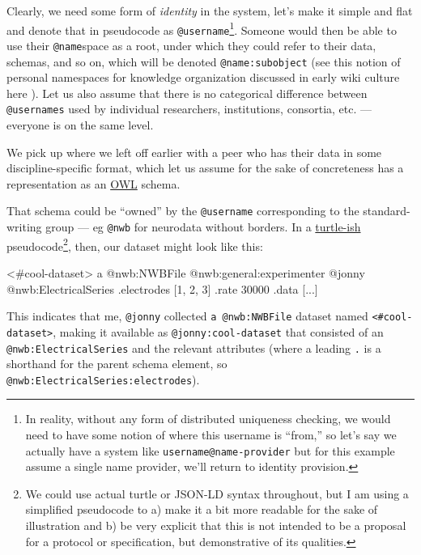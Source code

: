 \documentclass[10pt]{article}
\newenvironment{Shaded}{}{}
\newcommand{\NormalTok}[1]{#1}
\begin{document}
\begin{multicols}{2}
Clearly, we need some form of \emph{identity} in the system, let's make
it simple and flat and denote that in pseudocode as
\texttt{@username}\footnote{In reality, without any form of distributed
  uniqueness checking, we would need to have some notion of where this
  username is ``from,'' so let's say we actually have a system like
  \texttt{username@name-provider} but for this example assume a single
  name provider, we'll return to identity provision.}. Someone would
then be able to use their \texttt{@name}space as a root, under which
they could refer to their data, schemas, and so on, which will be
denoted \texttt{@name:subobject} (see this notion of personal namespaces
for knowledge organization discussed in early wiki culture here \cite{MeatballWikiPersonalCategories} ). Let us also assume that there
is no categorical difference between \texttt{@usernames} used by
individual researchers, institutions, consortia, etc. --- everyone is on
the same level.

We pick up where we left off earlier with a peer who has their data in
some discipline-specific format, which let us assume for the sake of
concreteness has a representation as an
\href{https://www.w3.org/OWL/}{OWL} schema.

That schema could be ``owned'' by the \texttt{@username} corresponding
to the standard-writing group --- eg \texttt{@nwb} for neurodata without
borders. In a \href{https://www.w3.org/TR/turtle/}{turtle-ish}
pseudocode\footnote{We could use actual turtle or JSON-LD syntax
  throughout, but I am using a simplified pseudocode to a) make it a bit
  more readable for the sake of illustration and b) be very explicit
  that this is not intended to be a proposal for a protocol or
  specification, but demonstrative of its qualities.}, then, our dataset
might look like this:

\begin{Shaded}
\begin{Highlighting}[]
\NormalTok{\textless{}\#cool{-}dataset\textgreater{}}
\NormalTok{  a @nwb:NWBFile}
\NormalTok{  @nwb:general:experimenter @jonny}
\NormalTok{  @nwb:ElectricalSeries}
\NormalTok{    .electrodes [1, 2, 3]}
\NormalTok{    .rate 30000}
\NormalTok{    .data [...]}
\end{Highlighting}
\end{Shaded}

This indicates that me, \texttt{@jonny} collected
\texttt{a\ @nwb:NWBFile} dataset named
\texttt{\textless{}\#cool-dataset\textgreater{}}, making it available as
\texttt{@jonny:cool-dataset} that consisted of an
\texttt{@nwb:ElectricalSeries} and the relevant attributes (where a
leading \texttt{.} is a shorthand for the parent schema element, so
\texttt{@nwb:ElectricalSeries:electrodes}).


\end{multicols}
\end{document}
